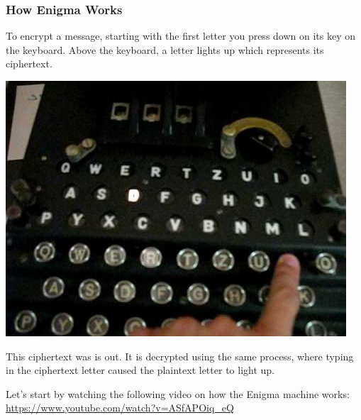 \documentclass{beamer}
\newcommand{\<}{\langle}
\renewcommand{\>}{\rangle}
\begin{document}
\begin{frame}
\frametitle{How Enigma Works}
\small 
To encrypt a message, starting with the first letter you press down on its key on the keyboard. Above the keyboard, a letter lights up which represents its ciphertext.\newline

\begin{center}
\includegraphics[scale=.2]{IMG/lamp}
\end{center}

This ciphertext was is out. It is decrypted using the same process, where typing in the ciphertext letter caused the plaintext letter to light up.\newline

Let's start by watching the following video on how the Enigma machine works:
\url{https://www.youtube.com/watch?v=ASfAPOiq_eQ}
\end{frame}
\end{document}
